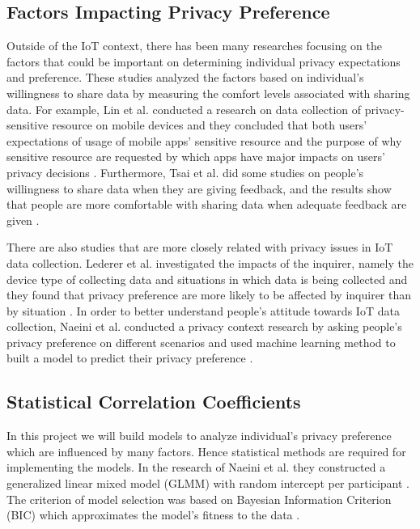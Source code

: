 \documentclass[a4paper,11pt]{article}
\begin{document}
\subsection{Factors Impacting Privacy Preference}
Outside of the IoT context, there has been many researches focusing on the factors that could be important on determining individual privacy expectations and preference. These studies analyzed the factors based on individual's willingness to share data by measuring the comfort levels associated with sharing data. For example, Lin et al. conducted a research on data collection of privacy-sensitive resource on mobile devices and they concluded that both users' expectations of usage of mobile apps' sensitive resource and the purpose of why sensitive resource are requested by which apps have major impacts on users' privacy decisions \cite{Lin12expectationand}. Furthermore, Tsai et al. did some studies on people's willingness to share data when they are giving feedback, and the results show that people are more comfortable with sharing data when adequate feedback are given \cite{Tsai09whosviewed}.

There are also studies that are more closely related with privacy issues in IoT data collection. Lederer et al. investigated the impacts of the inquirer, namely the device type of collecting data and situations in which data is being collected and they found that privacy preference are more likely to be affected by inquirer than by situation \cite{Lederer03whowants}. In order to better understand people's attitude towards IoT data collection, Naeini et al. conducted a privacy context research by asking people's privacy preference on different scenarios and used machine learning method to built a model to predict their privacy preference \cite{Naeini:2017}.

\subsection{Statistical Correlation Coefficients}

In this project we will build models to analyze individual's privacy preference which are influenced by many factors. Hence statistical methods are required for implementing the models. In the research of Naeini et al. they constructed a generalized linear mixed model (GLMM) with random intercept per participant \cite{Naeini:2017}. The criterion of model selection was based on Bayesian Information Criterion (BIC) which approximates the model's fitness to the data \cite{doi:10.1198/016214504000000269}.
\end{document}

